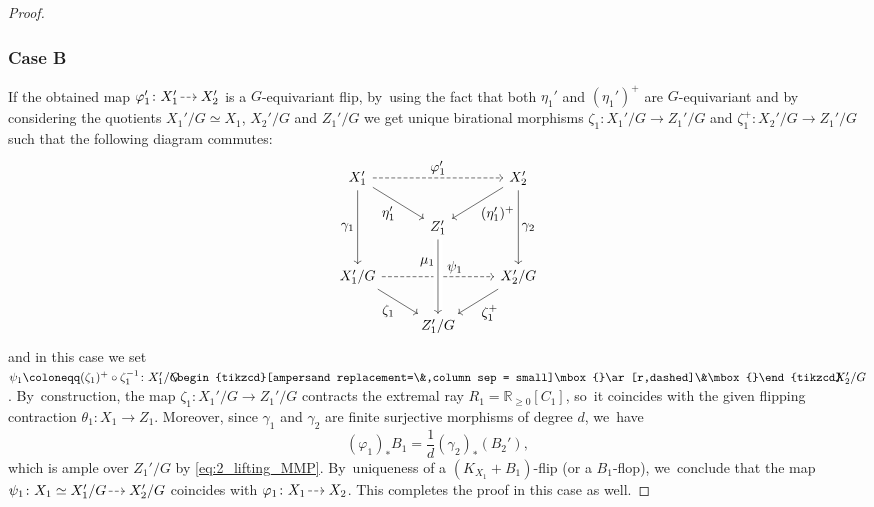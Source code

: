 \documentclass[JEP,XML,SOM,Unicode,published]{cedram}
\let\ts\textstyle
\newcommand{\dradpl}{{\hspace*{-2.5mm}\begin{tikzcd}[ampersand replacement=\&,column sep = scriptsize]\mbox{}\ar[r,dashed]\&\mbox{}\end{tikzcd}\hspace*{-2.5mm}}}
\newcommand{\dratst}{{\hspace*{-2.5mm}\begin{tikzcd}[ampersand replacement=\&,column sep = small]\mbox{}\ar[r,dashed]\&\mbox{}\end{tikzcd}\hspace*{-2mm}}}
\let\drascst\dratst
\newcommand{\dra}{\mathchoice{\dradpl}{\dratst}{\drascst}{\drascst}}
\theoremstyle{plain}
\theoremstyle{definition}
\newcommand{\R}{\mathbb{R}}
\begin{document}
\begin{proof}
\subsubsection*{Case B}
If the obtained map $\varphi'_1 \colon X_1' \dra X_2'$ is a $G$\nobreakdash-equivariant flip, by~using the fact that both $\eta_1'$ and $(\eta_1')^+$ are $G$\nobreakdash-equivariant and by considering the quotients \hbox{$X_1' / G \!\simeq\! X_1$}, $X_2' / G$ and $Z_1' / G$ we get unique birational morphisms $\zeta_1 \colon X_1' / G \to Z_1' / G$ and $\zeta_1^+ \colon X_2' / G \to Z_1' / G$ such that the following diagram commutes:
\[
\begin{tikzcd}
X'_1 \arrow[dd, "\ts \gamma_1" swap] \arrow[rr, "\ts \varphi'_1", dashed] \arrow[dr, "\ts \eta'_1" swap] && X'_2 \arrow[dl, "\ts (\eta'_1)^+"] \arrow[dd, "\ts \gamma_2"] \\
& Z'_1 \arrow[dd, "\ts \mu_1", pos=0.3, swap] \\
X_1' / G \arrow[rr, "\ts \psi_1", pos=0.65, dashed] \arrow[dr, "\ts \zeta_1" swap] && X_2' / G \arrow[dl, "\ts \zeta_1^+"] \\
& Z_1' / G\arrow[uu,leftarrow, crossing over]
\end{tikzcd}
\]
and in this case we set $\psi_1 \coloneqq (\zeta_1)^+ \circ \zeta_1^{-1} \colon X_1' / G \dra X_2' / G$. By~construction, the map $\zeta_1 \colon X_1' / G \to Z_1' / G$ contracts the extremal ray $R_1 = \R_{\geq 0}[C_1]$, so~it coincides with the given flipping contraction $\theta_1 \colon X_1 \to Z_1$. Moreover, since $\gamma_1$ and $\gamma_2$ are finite surjective morphisms of degree $d$, we~have
\[
(\varphi_1)_* B_1 = \frac{1}{d} (\gamma_2)_*(B_2'),
\]
which is ample over $Z_1'/G$ by \eqref{eq:2_lifting_MMP}. By~uniqueness of a $(K_{X_1}+B_1)$-flip (or a $B_1$-flop), we~conclude that the map $\psi_1 \colon X_1 \simeq X_1' / G \dra X_2' / G$ coincides with $\varphi_1 \colon X_1 \dra X_2$. This completes the proof in this case as well.
\end{proof}
\end{document}
